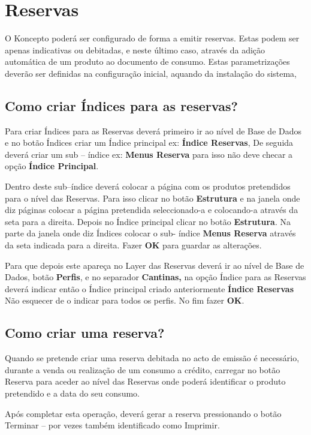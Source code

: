 \documentclass[a4paper,11pt,openany]{memoir}
\begin{document}
\chapter{Reservas}

O Koncepto poderá ser configurado de forma a emitir reservas. Estas podem ser
apenas indicativas ou debitadas, e neste último caso, através da adição automática
de um produto ao documento de consumo. Estas parametrizações deverão ser
definidas na configuração inicial, aquando da instalação do sistema,

\section{Como criar Índices para as reservas?}
Para criar Índices para as Reservas deverá primeiro ir ao nível de Base de Dados e
no botão Índices criar um Índice principal ex: \textbf{Índice Reservas}, De seguida deverá
criar um sub – índice ex: \textbf{Menus Reserva} para isso não deve checar a opção \textbf{Índice Principal}. 

Dentro deste sub–índice deverá colocar a página com os produtos
pretendidos para o nível das Reservas. Para isso clicar no botão \textbf{Estrutura} e na
janela onde diz páginas colocar a página pretendida seleccionado-a e colocando-a
através da seta para a direita. 
Depois no Índice principal clicar no botão \textbf{Estrutura}.
Na parte da janela onde diz Índices colocar o sub- índice \textbf{Menus Reserva} através
da seta indicada para a direita. Fazer \textbf{OK} para guardar as alterações.

Para que depois este apareça no Layer das Reservas deverá ir ao nível de Base de
Dados, botão \textbf{Perfis}, e no separador \textbf{Cantinas,} na opção Índice para as Reservas
deverá indicar então o Índice principal criado anteriormente \textbf{Índice Reservas}
Não esquecer de o indicar para todos os perfis. No fim fazer \textbf{OK}.


\section{Como criar uma reserva?}
Quando se pretende criar uma reserva debitada no acto de emissão é necessário,
durante a venda ou realização de um consumo a crédito, carregar no botão Reserva
para aceder ao nível das Reservas onde poderá identificar o produto pretendido e a
data do seu consumo. 

Após completar esta operação, deverá gerar a reserva
pressionando o botão Terminar – por vezes também identificado como Imprimir.
\end{document}
